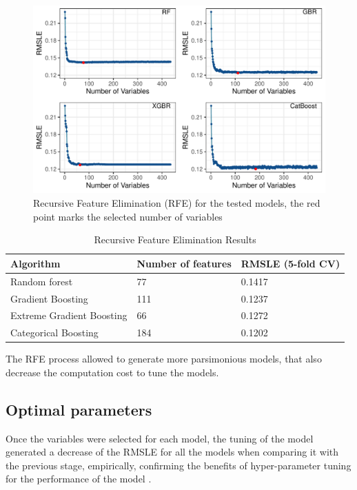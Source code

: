 \documentclass[11pt,onecolumn,titlepage,letterpaper]{article}
\begin{document}
\begin{figure}[H]
	\begin{center}
		\includegraphics[width=0.8\linewidth]{RFE.pdf}
	\end{center}
	\caption{Recursive Feature Elimination (RFE) for the tested models, the red point marks the selected number of variables}
	\label{fig:rfe}
\end{figure}


\begin{table}[H]
	\begin{center}
		\begin{tabular}{|p{4.2cm}|p{4cm}|p{4cm}|}
			\hline
			Algorithm & Number of features & RMSLE (5-fold CV) \\
			\hline\hline
			Random forest & 77 & 0.1417\\
			Gradient Boosting & 111 & 0.1237 \\
			Extreme Gradient Boosting  & 66 & 0.1272\\
			Categorical Boosting & 184 & 0.1202\\
			\hline
		\end{tabular}
	\end{center}
	\caption{Recursive Feature Elimination Results}
	\label{table:rfe}
\end{table}

The RFE process allowed to generate more parsimonious models, that also decrease the computation cost to tune the models.

\subsection{Optimal parameters}

Once the variables were selected for each model, the tuning of the model generated a decrease of the RMSLE for all the models when comparing it with the previous stage, empirically, confirming the benefits of hyper-parameter tuning for the performance of the model \cite{Hastie2009}.
\end{document}
